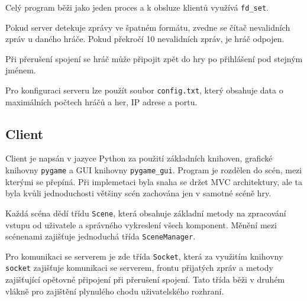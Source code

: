 \documentclass[11pt,a4paper]{article}
\begin{document}
Celý program běži jako jeden proces a k obsluze klientů využívá \texttt{fd\_set}.

Pokud server detekuje zprávy ve špatném formátu, zvedne se čítač nevalidních zpráv u daného hráče. Pokud překročí 10 nevalidních zpráv, je hráč odpojen.

Při přerušení spojení se hráč může připojit zpět do hry po přihlášení pod stejným jménem.

Pro konfiguraci serveru lze použít soubor \texttt{config.txt}, který obsahuje data o maximálních počtech hráčů a her, IP adrese a portu.
\subsection{Client}
Client je napsán v jazyce Python za použití základních knihoven, grafické knihovny \texttt{pygame} a GUI knihovny \texttt{pygame\_gui}. Program je rozdělen do scén, mezi kterými se přepíná. Při implemetaci byla snaha se držet MVC architektury, ale ta byla kvůli jednoduchosti většiny scén zachována jen v samotné scéně hry. 

Každá scéna dědí třídu \texttt{Scene}, která obsahuje základní metody na zpracování vstupu od uživatele a správného vykreslení všech komponent. Měnění mezi scénenami zajišťuje jednoduchá třída \texttt{SceneManager}.

Pro komunikaci se serverem je zde třída \texttt{Socket}, která za využitím knihovny \texttt{socket} zajišťuje komunikaci se serverem, frontu přijatých zpráv a metody zajišťující opětovné připojení při přerušení spojení. Tato třída běži v druhém vlákně pro zajištění plynulého chodu uživatelského rozhraní.
\end{document}
